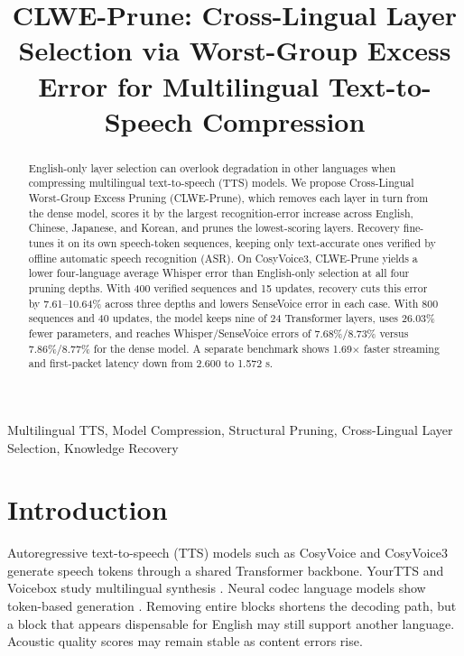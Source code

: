 \documentclass{article}
\title{CLWE-Prune: Cross-Lingual Layer Selection via Worst-Group Excess Error for Multilingual Text-to-Speech Compression}
\begin{document}
\ninept
%
\maketitle

\begingroup
\renewcommand{\thefootnote}{\fnsymbol{footnote}}
\endgroup
%
\begin{abstract}
English-only layer selection can overlook degradation in other
languages when compressing multilingual text-to-speech (TTS) models.
We propose Cross-Lingual Worst-Group Excess Pruning (CLWE-Prune), which
removes each layer in turn from the dense model, scores it by the
largest recognition-error increase across English, Chinese, Japanese,
and Korean, and prunes the lowest-scoring layers. Recovery
fine-tunes it on its own speech-token sequences, keeping only
text-accurate ones verified by offline automatic speech recognition
(ASR). On CosyVoice3, CLWE-Prune yields a lower four-language
average Whisper error than English-only selection at all four
pruning depths. With 400 verified sequences and 15 updates,
recovery cuts this error by 7.61--10.64\% across three depths and
lowers SenseVoice error in each case. With 800 sequences and 40
updates, the model keeps nine of 24 Transformer layers, uses
26.03\% fewer parameters, and reaches Whisper/SenseVoice errors of
7.68\%/8.73\% versus 7.86\%/8.77\% for the dense model. A separate
benchmark shows 1.69$\times$ faster streaming and first-packet
latency down from 2.600 to 1.572 s.
\end{abstract}
%
\begin{keywords}
Multilingual TTS, Model Compression, Structural Pruning, Cross-Lingual Layer Selection, Knowledge Recovery
\end{keywords}
%

\section{Introduction}
\label{sec:intro}

Autoregressive text-to-speech (TTS) models such as CosyVoice
\cite{du2024cosyvoice} and CosyVoice3 \cite{du2025cosyvoice3}
generate speech tokens through a shared Transformer backbone.
YourTTS and Voicebox study multilingual synthesis
\cite{casanova2022yourtts,le2023voicebox}. Neural codec language models
show token-based generation \cite{wang2023neuralcodec}.
Removing entire blocks shortens the decoding path, but a block that
appears dispensable for English may still support another language.
Acoustic quality scores may remain stable as content errors rise.
\end{document}
